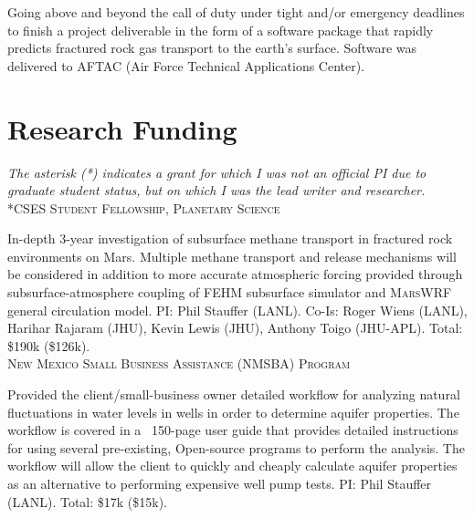 \documentclass[11pt, letterpaper]{article}
\newcommand{\years}[1]{\marginnote{\scriptsize #1}}
\begin{document}
    Going above and beyond the call of duty under tight and/or emergency
    deadlines to finish a project deliverable in the form of a software package
    that rapidly predicts fractured rock gas transport to the earth's surface.
    Software was delivered to AFTAC (Air Force Technical Applications Center).

\section*{Research Funding}
\label{sec:funding}
\noindent
\emph{The asterisk (*) indicates a grant for which I was not an official PI due
to graduate student status, but on which I was the lead writer and researcher.}\\

\years{2021}\textsc{*CSES Student Fellowship, Planetary Science}

	In-depth 3-year investigation of subsurface methane transport in fractured rock
	environments on Mars. Multiple methane transport and release mechanisms 
	will be considered in addition to more accurate atmospheric forcing
	provided through subsurface-atmosphere coupling of \textsc{FEHM} subsurface
	simulator and \textsc{MarsWRF} general circulation model. 
	PI: Phil Stauffer (LANL). Co-Is: Roger Wiens (LANL), Harihar Rajaram (JHU),
	Kevin Lewis (JHU), Anthony Toigo (JHU-APL). Total: \$190k (\$126k).\\

\years{2021}\textsc{New Mexico Small Business Assistance (NMSBA) Program}

	Provided the client/small-business owner detailed workflow for analyzing
	natural fluctuations in water levels in wells in order to determine aquifer
	properties. The workflow is covered in a ~150-page user guide that provides
	detailed instructions for using several pre-existing, Open-source programs
	to perform the analysis. The workflow will allow the client to quickly and
	cheaply calculate aquifer properties as an alternative to performing
	expensive well pump tests.
	PI: Phil Stauffer (LANL). Total: \$17k (\$15k). \\
\end{document}
